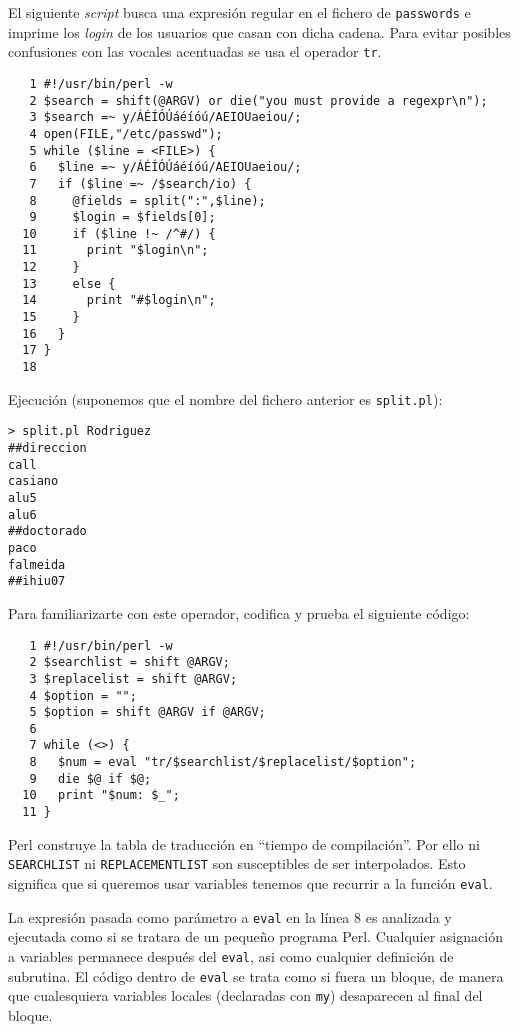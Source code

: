 El siguiente \emph{script} busca una expresión regular en el fichero de \verb|passwords|
e imprime los \emph{login} de los usuarios que casan con dicha cadena.
Para evitar posibles confusiones con las vocales acentuadas
se usa el operador \verb|tr|.

\begin{verbatim}
   1 #!/usr/bin/perl -w
   2 $search = shift(@ARGV) or die("you must provide a regexpr\n");
   3 $search =~ y/ÁÉÍÓÚáéíóú/AEIOUaeiou/;
   4 open(FILE,"/etc/passwd");
   5 while ($line = <FILE>) {
   6   $line =~ y/ÁÉÍÓÚáéíóú/AEIOUaeiou/;
   7   if ($line =~ /$search/io) {
   8     @fields = split(":",$line);
   9     $login = $fields[0];
  10     if ($line !~ /^#/) {
  11       print "$login\n";
  12     }
  13     else {
  14       print "#$login\n";
  15     }
  16   }
  17 }
  18   
\end{verbatim}

Ejecución (suponemos que el nombre del fichero anterior es \verb|split.pl|):
\begin{verbatim}
> split.pl Rodriguez
##direccion
call
casiano
alu5
alu6
##doctorado
paco
falmeida
##ihiu07 
\end{verbatim}


Para familiarizarte con este operador, codifica y prueba el siguiente
código:

\begin{verbatim}
   1 #!/usr/bin/perl -w
   2 $searchlist = shift @ARGV;
   3 $replacelist = shift @ARGV;
   4 $option = "";
   5 $option = shift @ARGV if @ARGV;
   6 
   7 while (<>) {
   8   $num = eval "tr/$searchlist/$replacelist/$option";
   9   die $@ if $@;
  10   print "$num: $_";
  11 }
\end{verbatim}

Perl construye la tabla de traducción en ``tiempo de compilación''. Por ello
ni \verb|SEARCHLIST| ni \verb|REPLACEMENTLIST| son susceptibles de 
ser interpolados. Esto significa que si queremos usar variables tenemos
que recurrir a la función \verb|eval|.

La expresión pasada como parámetro a \verb|eval| en la línea 8 es analizada y ejecutada como si 
se tratara de un pequeño programa Perl. Cualquier asignación a variables permanece
después del \verb|eval|, asi como cualquier definición de subrutina. 
El código dentro de \verb|eval| se trata como si fuera un bloque, de manera
que cualesquiera variables locales (declaradas con \verb|my|) desaparecen
al final del bloque.

